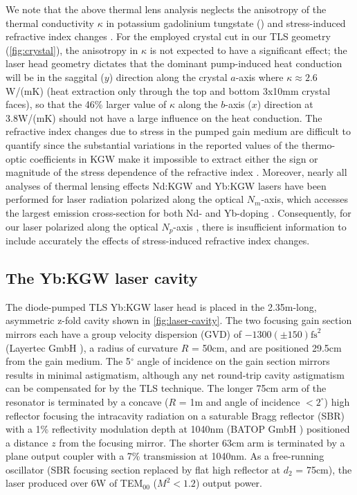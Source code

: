 We note that the above thermal lens analysis neglects the anisotropy of the thermal conductivity $\kappa$ in potassium gadolinium tungstate () \cite{Biswal_thermo_optical_05,mochalov_laser_1997} and stress-induced refractive index changes \cite{Yumashev_laser_2007}.
For the employed crystal cut in our TLS geometry (\ref{fig:crystal}), the anisotropy in $\kappa$ \cite{mochalov_laser_1997,website_EKSPLA} is not expected to have a significant effect; the laser head geometry dictates that the dominant pump-induced heat conduction will be in the saggital ($y$) direction along the crystal $a$-axis where $\kappa \approx 2.6$W/(mK) (heat extraction only through the top and bottom 3x10mm crystal faces), so that the 46\% larger value of $\kappa$ along the $b$-axis ($x$) direction at 3.8W/(mK) should not have a large influence on the heat conduction.
The refractive index
changes due to stress in the pumped gain medium are difficult to quantify since the substantial variations in the reported values of the thermo-optic coefficients in KGW make it impossible to extract either the sign or magnitude of the stress dependence of the refractive index \cite{website_time_bandwidth}.
Moreover, nearly all analyses of thermal lensing effects Nd:KGW and Yb:KGW lasers have been performed for laser radiation polarized along the optical $N_m$-axis, which accesses the largest emission cross-section for both Nd- and Yb-doping \cite{Yumashev_laser_2007,Hellstrom_efficient_2006}.
Consequently, for our laser polarized along the optical $N_p$-axis \cite{Holtom_mode_locked_2006}, there is insufficient information to include accurately the effects of stress-induced refractive index changes.

\subsection{The Yb:KGW laser cavity}

The diode-pumped TLS Yb:KGW laser head is placed in the 2.35m-long, asymmetric z-fold cavity shown in \ref{fig:laser-cavity}.
The two focusing gain section mirrors each have a group velocity dispersion (GVD) of $-1300 ( \pm 150 ) \text{fs}^2$ (Layertec GmbH \cite{website_layertec}), a radius of curvature $R$ = 50cm, and are positioned 29.5cm from the gain medium.
The 5$^\circ$ angle of incidence on the gain section mirrors results in minimal astigmatism, although any net round-trip cavity astigmatism can be compensated for by the TLS technique.
The longer 75cm arm of the resonator is terminated by a concave ($R$ = 1m and angle of incidence $< 2^\circ$) high reflector
focusing the intracavity radiation on a saturable Bragg reflector (SBR) with a 1\% reflectivity modulation depth at 1040nm (BATOP GmbH \cite{website_BATOP}) positioned a distance $z$ from the focusing mirror.
The shorter 63cm arm is terminated by a plane output coupler with a 7\% transmission at 1040nm.
As a free-running oscillator (SBR focusing section replaced by flat high reflector at $d_2$ = 75cm), the laser produced over 6W of TEM$_{00}$ ($M^2 < 1.2$) output power.

